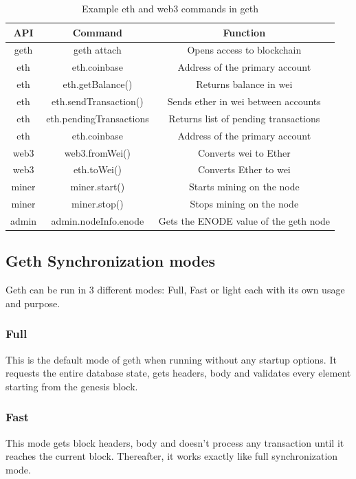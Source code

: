 \documentclass[11pt,openright]{report}
\begin{document}
\begin{table}[!htbp]
	\renewcommand{\arraystretch}{1.3}
	\caption{Example eth and web3 commands in geth}
	\label{geth_commands}
	\centering
	\begin{tabular}{|c|c|c|}
		\hline
		\bfseries API & \bfseries Command & \bfseries Function \\
		\hline\hline
		geth & geth attach & Opens access to blockchain \\ \hline
		eth & eth.coinbase & Address of the primary account \\ \hline
		eth & eth.getBalance() & Returns balance in wei \\ \hline
        eth & eth.sendTransaction() & Sends ether in wei between accounts \\ \hline
        eth & eth.pendingTransactions & Returns list of pending transactions\\ \hline
        eth & eth.coinbase & Address of the primary account \\ \hline
        web3 & web3.fromWei() & Converts wei to Ether \\ \hline
        web3 & eth.toWei() & Converts Ether to wei \\ \hline
        miner & miner.start() & Starts mining on the node \\ \hline
        miner & miner.stop() & Stops mining on the node \\ \hline
        admin & admin.nodeInfo.enode & Gets the ENODE value of the geth node \\ \hline
	\end{tabular}
\end{table}


\newpage
\subsection{Geth Synchronization modes}
Geth can be run in 3 different modes: Full, Fast or light each with its own usage and purpose.

\subsubsection{Full} 
This is the default mode of geth when running without any startup options. It requests the entire database state, gets headers, body and validates every element starting from the genesis block.

\subsubsection{Fast}
This mode gets block headers, body and doesn't process any transaction until it reaches the current block. Thereafter, it works exactly like full synchronization mode.
\end{document}
